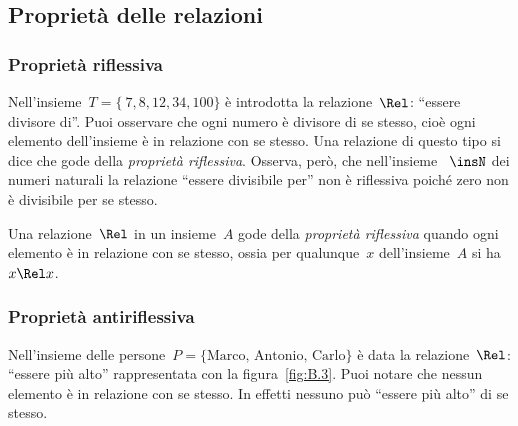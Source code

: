 \subsection{Proprietà delle relazioni}
\label{subsec:rel_proprieta}

\subsubsection{Proprietà riflessiva}

\begin{exrig}
 \begin{esempio}

Nell'insieme~\(T = \lbrace~7, 8, 12, 34, 100 \rbrace\) è introdotta la 
relazione~\(\Rel\): ``essere divisore di''.
Puoi osservare che ogni numero è divisore di se stesso, cioè ogni elemento 
dell'insieme è in relazione
con se stesso. Una relazione di questo tipo si dice che gode della 
\emph{proprietà riflessiva}.
Osserva, però, che nell'insieme ~\(\insN\) dei numeri naturali la relazione 
``essere divisibile per'' non è riflessiva poiché zero non è divisibile per se 
stesso.
 \end{esempio}
\end{exrig}

\begin{definizione}
Una relazione~\(\Rel\) in un insieme~\(A\) gode della \emph{proprietà riflessiva} 
quando ogni elemento è in relazione con se stesso, ossia per qualunque~\(x\)
dell'insieme~\(A\) si ha~\(x \Rel x\).
\end{definizione}


\subsubsection{Proprietà antiriflessiva}

\begin{exrig}
 \begin{esempio}
Nell'insieme delle persone~\(P = \lbrace\text{Marco, Antonio, Carlo}\rbrace\) è 
data la relazione~\(\Rel\): ``essere più alto''
rappresentata con la figura~\ref{fig:B.3}.
Puoi notare che nessun elemento è in relazione con se stesso. In effetti nessuno 
può ``essere più alto'' di se stesso.

 \end{esempio}
\end{exrig}

